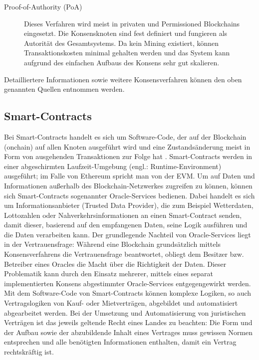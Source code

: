 \begin{description}
  \item[Proof-of-Authority (PoA)] Dieses Verfahren wird meist in privaten und Permissioned Blockchains eingesetzt. Die Konsensknoten sind fest definiert und fungieren als Autorität des Gesamtsystems. Da kein Mining existiert, können Transaktionskosten minimal gehalten werden und das System kann aufgrund des einfachen Aufbaus des Konsens sehr gut skalieren.
\end{description}
Detailliertere Informationen sowie weitere Konsensverfahren können den oben genannten Quellen entnommen werden.

\subsection{Smart-Contracts}
\label{subsec:fundamentals:dlt:smartcontracts}
Bei Smart-Contracts handelt es sich um Software-Code, der auf der Blockchain (onchain) auf allen Knoten ausgeführt wird und eine Zustandsänderung meist in Form von ausgehenden Transaktionen zur Folge hat \cite{smartcontracts2017}. Smart-Contracts werden in einer abgeschirmten Laufzeit-Umgebung (engl.: Runtime-Environment) ausgeführt; im Falle von Ethereum spricht man von der \ac{EVM}. Um auf Daten und Informationen außerhalb des Blockchain-Netzwerkes zugreifen zu können, können sich Smart-Contracts sogenannter Oracle-Services bedienen. Dabei handelt es sich um Informationsanbieter (Trusted Data Provider), die zum Beispiel Wetterdaten, Lottozahlen oder Nahverkehrsinformationen an einen Smart-Contract senden, damit dieser, basierend auf den empfangenen Daten, seine Logik ausführen und die Daten verarbeiten kann. Der grundlegende Nachteil von Oracle-Services liegt in der Vertrauensfrage: Während eine Blockchain grundsätzlich mittels Konsensverfahrens die Vertrauensfrage beantwortet, obliegt dem Besitzer bzw. Betreiber eines Oracles die Macht über die Richtigkeit der Daten. Dieser Problematik kann durch den Einsatz mehrerer, mittels eines separat implementierten Konsens abgestimmter Oracle-Services entgegengewirkt werden.\\
Mit dem Software-Code von Smart-Contracts können komplexe Logiken, so auch Vertragslogiken von Kauf- oder Mietverträgen, abgebildet und automatisiert abgearbeitet werden. Bei der Umsetzung und Automatisierung von juristischen Verträgen ist das jeweils geltende Recht eines Landes zu beachten: Die Form und der Aufbau sowie der abzubildende Inhalt eines Vertrages muss gewissen Normen entsprechen und alle benötigten Informationen enthalten, damit ein Vertrag rechtskräftig ist.

